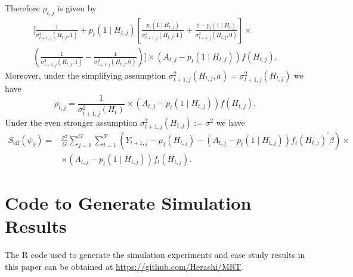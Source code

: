 \documentclass[12pt]{article}
\begin{document}
Therefore $\rho_{t,j}$ is given by
\begin{align*}
\bigg[ \frac{1}{\sigma^2_{t+1,j} (H_{t,j}, 1)} + p_t ( 1 \mid H_{t,j}) \left[  \frac{p_t (1 \mid H_{t,j} )}{\sigma^2_{t+1,j} (H_{t,j}, 1)} + \frac{1-p_t (1 \mid H_t )}{\sigma^2_{t+1,j} (H_{t,j}, 0)} \right] \times \\
\left( \frac{1}{\sigma^2_{t+1,j} (H_{t,j}, 1)}  - \frac{1}{\sigma^2_{t+1,j} (H_{t,j}, 0)} \right)
 \bigg] \times \left( A_{t,j} - p_t (1 \mid H_{t,j}) \right) f(H_{t,j}).
\end{align*}
Moreover, under the simplifying assumption $\sigma^2_{t+1,j} (H_{t,j}, a) = \sigma^2_{t+1,j} (H_{t,j})$ we have
$$
\rho_{t,j} = \frac{1}{\sigma^2_{t+1,j} (H_t)} \times \left( A_{t,j} - p_t (1 \mid H_{t,j}) \right) f(H_{t,j}).
$$
Under the even stronger assumption $\sigma^2_{t+1,j} (H_{t,j}) := \sigma^2$ we have
\begin{align*}
S_{\text{eff}} (\psi_0) =&  \frac{\sigma^2}{G} \sum_{j=1}^G \sum_{t=1}^T \left(Y_{t+1,j} - \mu_t (H_{t,j}) - (A_{t,j} - p_t (1 \mid H_{t,j})) f_t (H_{t,j})^\prime \beta \right) \times \\
&\times (A_{t,j} - p_t (1 \mid H_{t,j})) f_t (H_{t,j}).
\end{align*}

\section{Code to Generate Simulation Results}
The R code used to generate the simulation experiments and case study results in this paper can be obtained at
\href{https://github.com/Herashi/MRT}{https://github.com/Herashi/MRT}.


\end{document}
